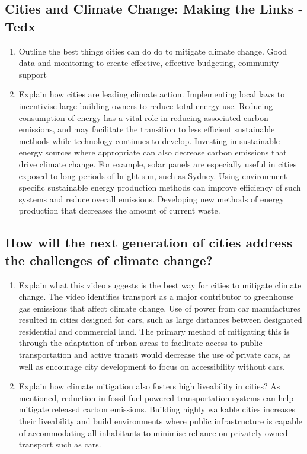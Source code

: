 	\subsection{Cities and Climate Change: Making the Links - Tedx}
		\begin{enumerate}
				\item Outline the best things cities can do do to mitigate climate change.
					\subitem Good data and monitoring to create effective, effective budgeting, community support
				\item Explain how cities are leading climate action.
					\subitem Implementing local laws to incentivise large building owners to reduce total energy use. Reducing consumption of energy has a vital role in reducing associated carbon emissions, and may facilitate the transition to less efficient sustainable methods while technology continues to develop. Investing in sustainable energy sources where appropriate can also decrease carbon emissions that drive climate change. For example, solar panels are especially useful in cities exposed to long periods of bright sun, such as Sydney. Using environment specific sustainable energy production methods can improve efficiency of such systems and reduce overall emissions. Developing new methods of energy production that decreases the amount of current waste.
		\end{enumerate}
	\subsection{How will the next generation of cities address the challenges of climate change?}
		\begin{enumerate}
			\item Explain what this video suggests is the best way for cities to mitigate climate change.
				\subitem The video identifies transport as a major contributor to greenhouse gas emissions that affect climate change. Use of power from car manufactures resulted in cities designed for cars, such as large distances between designated residential and commercial land. The primary method of mitigating this is through the adaptation of urban areas to facilitate access to public transportation and active transit would decrease the use of private cars, as well as encourage city development to focus on accessibility without cars.
			\item Explain how climate mitigation also fosters high liveability in cities?
				\subitem As mentioned, reduction in fossil fuel powered transportation systems can help mitigate released carbon emissions. Building highly walkable cities increases their liveability and build environments where public infrastructure is capable of accommodating all inhabitants to minimise reliance on privately owned transport such as cars.
		\end{enumerate}

